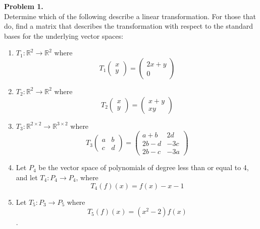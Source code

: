 \documentclass[11pt]{article}
\begin{document}
\noindent \textbf{Problem 1.}\\
Determine which of the following describe a linear transformation. For those that do, find a matrix that describes the transformation with respect to the standard bases for the underlying vector spaces:
\begin{enumerate}
\item $T_1:\mathbb{R}^2\to\mathbb{R}^2$ where
$$T_1\begin{pmatrix} x \\ y \end{pmatrix} = \begin{pmatrix} 2x+y \\ 0 \end{pmatrix}$$
\item $T_2:\mathbb{R}^2\to\mathbb{R}^2$ where
$$T_2\begin{pmatrix} x \\ y \end{pmatrix} = \begin{pmatrix} x+y \\ xy \end{pmatrix}$$
\item $T_3:\mathbb{R}^{2\times 2}\to \mathbb{R}^{3\times2}$ where
$$T_3\begin{pmatrix} a & b \\ c & d \end{pmatrix} = \begin{pmatrix} a+b & 2d \\ 2b-d & -3c \\ 2b-c & -3a \end{pmatrix}$$
\item Let $P_4$ be the vector space of polynomials of degree less than or equal to 4, and let $T_4 :P_4\to P_4$, where
$$T_4(f)(x) = f(x) - x - 1$$
\item Let $T_5 :P_3\to P_5$ where 
$$T_5(f)(x) = (x^2-2)f(x)$$. 
\end{enumerate}

\newpage
\end{document}
